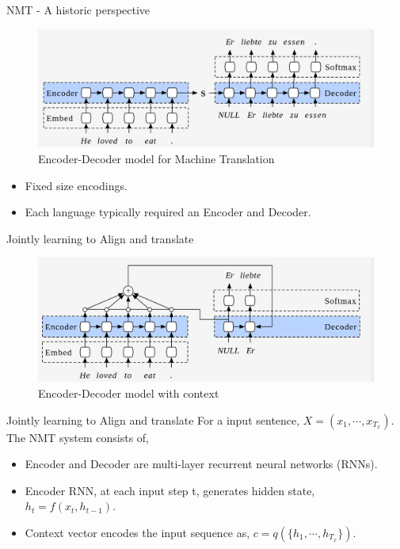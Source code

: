 ﻿\documentclass[aspectratio=43,mathserif,xcolor={usenames,dvipsnames,svgnames,table},10pt]{beamer}
\begin{document}
\begin{frame}{NMT - A historic perspective}
  \begin{figure}[h]
    \includegraphics[width=0.9\linewidth]{images/enc_dec.png}  
    \caption{Encoder-Decoder model for Machine Translation}
  \end{figure}
\begin{itemize}
 \item Fixed size encodings.
 \item Each language typically required an Encoder and Decoder.
\end{itemize}
\end{frame}

\begin{frame}{Jointly learning to Align and translate}
\begin{figure}[h]
    \includegraphics[width=0.9\linewidth]{images/context.png}  
    \caption{Encoder-Decoder model with context}
  \end{figure}
\end{frame}

\begin{frame}{Jointly learning to Align and translate}
For a input sentence, $X = (x_1,\cdots, x_{T_{x}} )$. The NMT 
system consists of,
  \begin{itemize}
   \item Encoder and Decoder are multi-layer recurrent neural networks (RNNs).
   \item Encoder RNN, at each input step t, generates hidden state, $h_t = f(x_t, h_{t-1})$.
   \item Context vector encodes the input sequence as, $c = q(\{h_1,\cdots,h_{T_x}\})$.
  \end{itemize}
\end{frame}
\end{document}
